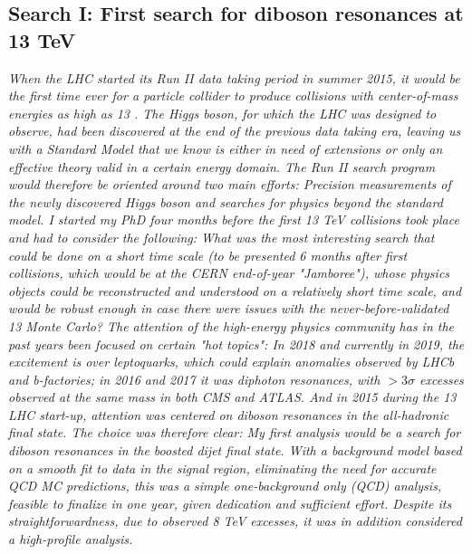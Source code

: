 \begin{singlespace}
\begin{centering}
\section{Search I: First search for diboson resonances at 13 TeV}
\label{searchI}
\textit{
\noindent When the LHC started its Run II data taking period in summer 2015, it would be the first time ever for a particle collider to produce collisions with center-of-mass energies as high as 13 \TeV. The Higgs boson, for which the LHC was designed to observe, had been discovered at the end of the previous data taking era, leaving us with a Standard Model that we know is either in need of extensions or only an effective theory valid in a certain energy domain. The Run II search program would therefore be oriented around two main efforts: Precision measurements of the newly discovered Higgs boson and searches for physics beyond the standard model.
\newline
\newline
I started my PhD four months before the first 13 TeV collisions took place and had to consider the following:
What was the most interesting search that could be done on a short time scale (to be presented 6 months after first collisions, which would be at the CERN end-of-year "Jamboree"), whose physics objects could be reconstructed and understood on a relatively short time scale, and would be robust enough in case there were issues with the never-before-validated 13 \TeV Monte Carlo?
\newline
\newline
The attention of the high-energy physics community has in the past years been focused on certain "hot topics": In 2018 and currently in 2019, the excitement is over leptoquarks, which could explain anomalies observed by LHCb and b-factories; in 2016 and 2017 it was diphoton resonances, with $>3 \sigma$ excesses observed at the same mass in both CMS and ATLAS. And in 2015 during the 13 \TeV LHC start-up, attention was centered on diboson resonances in the all-hadronic final state. The choice was therefore clear: My first analysis would be a search for diboson resonances in the boosted dijet final state. With a background model based on a smooth fit to data in the signal region, eliminating the need for accurate QCD MC predictions, this was a simple one-background only (QCD) analysis, feasible to finalize in one year, given dedication and sufficient effort. Despite its straightforwardness, due to observed 8 TeV excesses, it was in addition considered a high-profile analysis.
}
\end{centering}
\end{singlespace}
